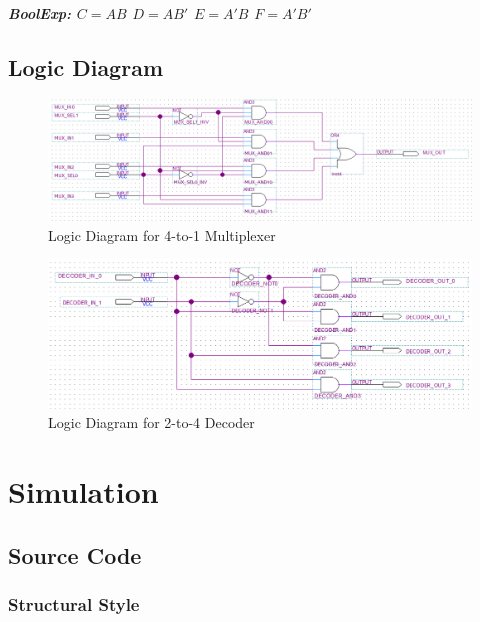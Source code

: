 \documentclass{report}
\begin{document}
                \paragraph{BoolExp: $ C = AB $ $ D = AB' $ $ E = A'B $ $ F = A'B' $}
        \newpage
        \section{Logic Diagram}
            \begin{figure}[!htb]
                \centering
                \includegraphics[width=\textwidth]{diagrams/logic_mux.png}
                \caption{Logic Diagram for 4-to-1 Multiplexer}
            \end{figure}
            \begin{figure}[!htb]
                \centering
                \includegraphics[width=\textwidth]{diagrams/logic_decoder.png}
                \caption{Logic Diagram for 2-to-4 Decoder}
            \end{figure}
    \chapter{Simulation}

        \section{Source Code}
            \subsection{Structural Style}
\end{document}
